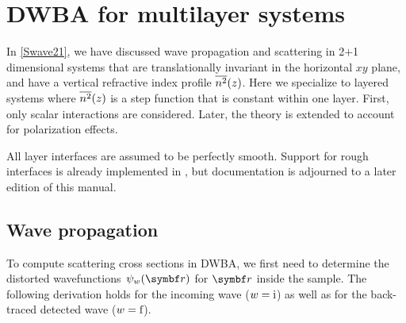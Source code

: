 

\chapter{DWBA for multilayer systems}  \label{sec:Multilayers}


%

In \cref{Swave21},
we have discussed wave propagation and scattering in 2$+$1 dimensional systems
that are translationally invariant in the horizontal $xy$ plane,
and have a vertical refractive index profile $\overline{n^2}(z)$.
Here we specialize to layered systems
where $\overline{n^2}(z)$ is a step function that is constant within one layer.
First, only scalar interactions are considered.
Later, the theory is extended to account for polarization effects.


All layer interfaces are assumed to be perfectly smooth.
Support for rough interfaces is already implemented in \BornAgain,
but documentation is adjourned to a later edition of this manual.

\section{Wave propagation}\label{Slayerprop}

To compute scattering cross sections in DWBA,
we first need to determine the distorted wavefunctions~$\psi_w(\r)$
for $\r$ inside the sample.
The following derivation holds for the incoming wave ($w=\text{i}$)
as well as for the back-traced detected wave ($w=\text{f}$).

